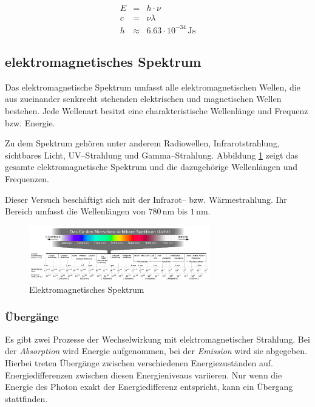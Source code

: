 \documentclass[12pt,a4paper]{scrartcl}
\numberwithin{equation}{section} %
\begin{document}
	\begin{eqnarray}
		E &=& h \cdot \nu \label{eq:Energie Photon} \\
		c &=& \nu\lambda \\
		h &\approx& 6.63 \cdot 10^{-34} \mathrm{\,Js}
	\end{eqnarray}
	
	\hypertarget{elektromagnetisches-spektrum}{\subsection{elektromagnetisches Spektrum}\label{elektromagnetisches-spektrum}}
	Das elektromagnetische Spektrum umfasst alle elektromagnetischen Wellen, die aus zueinander senkrecht stehenden elektrischen und magnetischen Wellen bestehen. Jede Wellenart besitzt eine charakteristische Wellenlänge und Frequenz bzw. Energie.
	
	Zu dem Spektrum gehören unter anderem Radiowellen, Infrarotstrahlung, sichtbares Licht, UV--Strahlung und Gamma--Strahlung. Abbildung \ref{abb:EM Spektrum} zeigt das gesamte elektromagnetische Spektrum und die dazugehörige Wellenlängen und Frequenzen.
	
	Dieser Versuch beschäftigt sich mit der Infrarot-- bzw. Wärmestrahlung. Ihr Bereich umfasst die Wellenlängen von $780\mathrm{\,nm}$ bis $1\mathrm{\,nm}$.
	
	\begin{figure}[h!]
		\centering
		\includegraphics[width=0.7\textwidth]{../media/B1.1/EM_Spektrum.png}
		\caption{Elektromagnetisches Spektrum \cite{Wikipedia: Elektromagnetisches Spektrum}}
		\label{abb:EM Spektrum}
	\end{figure}
	
	\subsubsection{Übergänge}
	\label{Übergänge}
	Es gibt zwei Prozesse der Wechselwirkung mit elektromagnetischer Strahlung. Bei der \emph{Absorption} wird Energie aufgenommen, bei der \emph{Emission} wird sie abgegeben. Hierbei treten Übergänge zwischen verschiedenen Energiezuständen auf. Energiedifferenzen zwischen diesen Energieniveaus variieren. Nur wenn die Energie des Photon exakt der Energiedifferenz entspricht, kann ein Übergang stattfinden.
	
\end{document}
